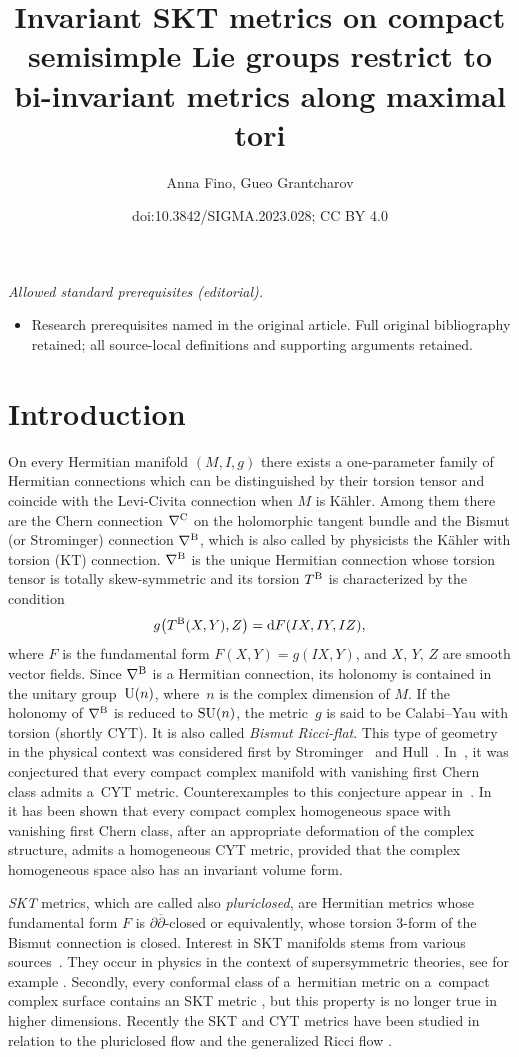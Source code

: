\documentclass[10pt,a4paper]{amsart}
\title{Invariant SKT metrics on compact semisimple Lie groups restrict to bi-invariant metrics along maximal tori}
\author{Anna Fino, Gueo Grantcharov}
\date{doi:10.3842/SIGMA.2023.028; CC BY 4.0}
\numberwithin{equation}{section}
\begin{document}
\maketitle
\noindent\textit{Allowed standard prerequisites (editorial).}\begin{itemize}
\item Research prerequisites named in the original article. Full original bibliography retained; all source-local definitions and supporting arguments retained.
\end{itemize}\medskip
\section{Introduction}

On every Hermitian manifold $(M, I, g)$ there exists a one-parameter family of Hermitian connections which can be distinguished by their torsion tensor and coincide with the Levi-Civita connection when $M$ is K\"ahler. Among them there are
the Chern connection $\nabla^{\rm C}$ on the holomorphic tangent bundle and the Bismut (or Strominger) connection $\nabla^{\rm B}$, which is also called by physicists the K\"ahler with torsion (KT) connection. $\nabla^{\rm B}$ is the unique Hermitian connection whose torsion tensor is totally skew-symmetric and its torsion $T^{\rm B}$ is characterized by the condition
\[
g \big(T^{\rm B}(X,Y), Z\big) = {\rm d}F(IX,IY,IZ),
\]
where $F$ is the fundamental form $F(X,Y) = g(IX,Y)$, and $X$, $Y$, $Z$ are smooth vector fields. Since $\nabla^{\rm B}$ is a Hermitian connection, its holonomy is contained in the unitary group~${\rm U}(n)$, where~$n$ is the complex dimension of $M$. If the holonomy of $\nabla^{\rm B}$ is reduced to ${\rm SU}(n)$, the metric~$g$
is said to be Calabi--Yau with torsion (shortly CYT). It is also called {\it Bismut Ricci-flat}.
This type of geometry in the physical context was considered first by Strominger~\cite{Strominger} and
Hull~\cite{Hull}. In~\cite{GIP}, it was conjectured that every compact complex manifold with vanishing first Chern class admits a~CYT metric. Counterexamples to this conjecture appear in~\cite{FG}. In~\cite{Grantcharov} it has been shown that every compact complex homogeneous space with vanishing first Chern class, after an appropriate deformation of the complex structure, admits a homogeneous CYT metric, provided that the complex homogeneous space also has an invariant volume form.

{\em SKT} metrics, which are called also {\em pluriclosed}, are Hermitian metrics whose fundamental form $F$ is $\partial \overline \partial$-closed or equivalently, whose torsion $3$-form of the Bismut connection is closed. Interest in SKT manifolds stems from various sources~\cite{Swann}. They occur in physics in the context of supersymmetric theories, see for example \cite{GHR,HP,Strominger}. Secondly, every conformal class of a~hermitian metric on a~compact complex surface contains an SKT metric \cite{Gau}, but this property is no longer true in higher dimensions. Recently the SKT and CYT metrics have been studied in relation to the pluriclosed flow and the generalized Ricci flow \cite{AFSU, Barbaro, GJS, GS}.
\end{document}
